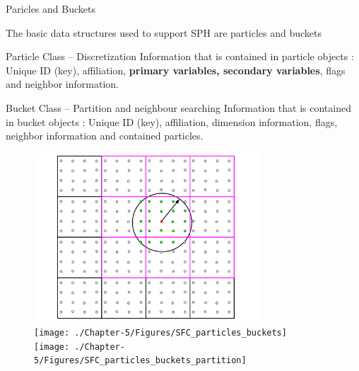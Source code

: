 \documentclass{beamer}
\begin{document}
\begin{frame}{Paricles and Buckets}
\centering
\begin{minipage}{0.66\linewidth}
The basic data structures used to support SPH are particles and buckets %
\begin{block}{Particle Class  -- Discretization}
Information that is contained in particle objects :
Unique ID (key), affiliation, {\bf primary variables, secondary variables}, flags and neighbor information.
\end{block}
\begin{block}{Bucket Class -- Partition and neighbour searching}
Information that is contained in bucket objects :
Unique ID (key), affiliation, dimension information, flags, neighbor information and contained particles.
\end{block}
\end{minipage}
\begin{minipage}{0.33 \linewidth}
\begin{figure}
\flushright
\includegraphics[width=0.75\textwidth]{./PPT/Neighbor-Search}
\\
\flushright
\texttt{[image: ./Chapter-5/Figures/SFC\_particles\_buckets]}
\\
\flushright
\texttt{[image: ./Chapter-5/Figures/SFC\_particles\_buckets\_partition]}
\end{figure}
\end{minipage}
\end{frame}
\end{document}
